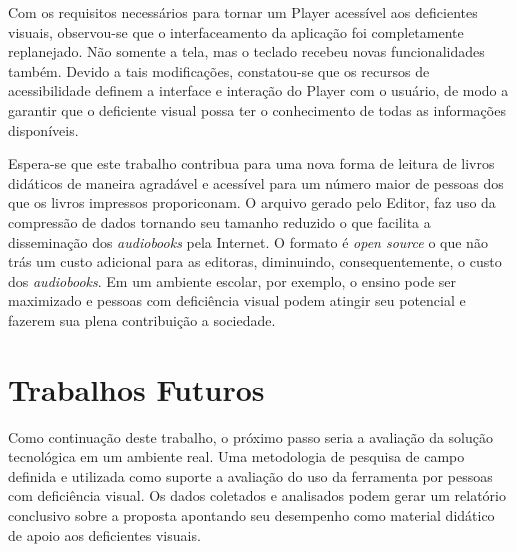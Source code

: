 Com os requisitos necessários para tornar um Player acessível aos deficientes visuais, observou-se que o interfaceamento da aplicação foi completamente replanejado. Não somente a tela, mas o teclado recebeu novas funcionalidades também. Devido a tais modificações, constatou-se que os recursos de acessibilidade definem a interface e interação do Player com o usuário, de modo a garantir que o deficiente visual possa ter o conhecimento de todas as informações disponíveis. 

Espera-se que este trabalho contribua para uma nova forma de leitura de livros didáticos de maneira agradável e acessível para um número maior de pessoas dos que os livros impressos proporiconam. O arquivo gerado pelo Editor, faz uso da compressão de dados tornando seu tamanho reduzido o que facilita a disseminação dos \textit{audiobooks} pela Internet. O formato é \textit{open source} o que não trás um custo adicional para as editoras, diminuindo, consequentemente, o custo dos \textit{audiobooks}. Em um ambiente escolar, por exemplo, o ensino pode ser maximizado e pessoas com deficiência visual podem atingir seu potencial e fazerem sua plena contribuição a sociedade.



\section{Trabalhos Futuros}

Como continuação deste trabalho, o próximo passo seria a avaliação da solução tecnológica em um ambiente real. Uma metodologia de pesquisa de campo definida e utilizada como suporte a avaliação do uso da ferramenta por pessoas com deficiência visual. Os dados coletados e analisados podem gerar um relatório conclusivo sobre a proposta apontando seu desempenho como material didático de apoio aos deficientes visuais.